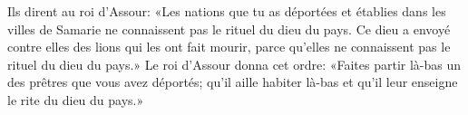 Ils dirent au roi d’Assour:
	«Les nations que tu as déportées et établies dans les villes de Samarie
	ne connaissent pas le rituel du dieu du pays.
Ce dieu a envoyé contre elles des lions qui les ont fait mourir,
	parce qu’elles ne connaissent pas le rituel du dieu du pays.»
Le roi d’Assour donna cet ordre:
	«Faites partir là-bas un des prêtres que vous avez déportés;
	qu’il aille habiter là-bas et qu’il leur enseigne le rite du dieu du pays.»
